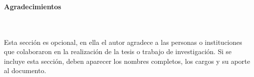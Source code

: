 \newpage{\pagestyle{empty}\cleardoublepage}

\newpage
\thispagestyle{empty} \textbf{}\normalsize
\\\\\\%
\textbf{\LARGE Agradecimientos}
\\\\
Esta secci\'{o}n es opcional, en ella el autor agradece a las personas o instituciones que colaboraron en la realizaci\'{o}n de la tesis  o trabajo de investigaci\'{o}n. Si se incluye esta secci\'{o}n, deben aparecer los nombres completos, los cargos y su aporte al documento.\\

\newpage{\pagestyle{empty}\cleardoublepage}